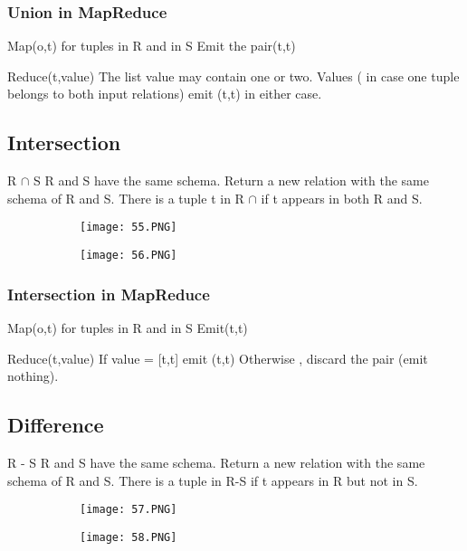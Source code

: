 \documentclass{article}
\begin{document}
\subsubsection{Union in MapReduce}

Map(o,t) for tuples in R and in S
Emit the pair(t,t)

Reduce(t,value)
The list value may contain one or two.
Values ( in case one tuple belongs to both input relations)
emit (t,t) in either case.


\vspace{10mm}

\subsection{Intersection}

R $\cap$ S 
R and S have the same schema.
Return a new relation with the same schema of R and S.
There is a tuple t in R $\cap$ if t appears in both R and S.

\begin{figure}[ht!]
  \centering
  \begin{subfigure}[b]{0.5\linewidth}
    \texttt{[image: 55.PNG]}
  \end{subfigure}
     \begin{subfigure}[b]{0.4\textwidth}
         \centering
         \texttt{[image: 56.PNG]}
     \end{subfigure}
\end{figure}

\subsubsection{Intersection in MapReduce}

Map(o,t) for tuples in R and in S
Emit(t,t)

Reduce(t,value)
If value = [t,t] emit (t,t)
Otherwise , discard the pair (emit nothing).


\subsection{Difference}

R - S 
R and S have the same schema.
Return a new relation with the same schema of R and S.
There is a tuple in R-S if t appears in R but not in S.

\begin{figure}[ht!]
  \centering
  \begin{subfigure}[b]{0.5\linewidth}
    \texttt{[image: 57.PNG]}
  \end{subfigure}
     \begin{subfigure}[b]{0.4\textwidth}
         \centering
         \texttt{[image: 58.PNG]}
     \end{subfigure}
\end{figure}
\end{document}
